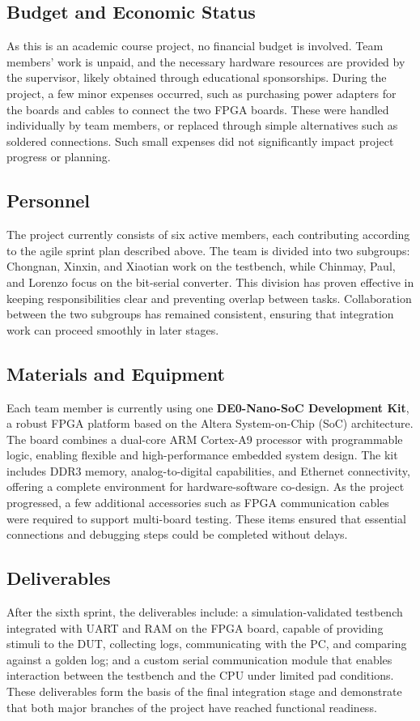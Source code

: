 \documentclass[10pt]{article}
\begin{document}
\subsection{Budget and Economic Status}
As this is an academic course project, no financial budget is involved. Team members’ work is unpaid, and the necessary hardware resources are provided by the supervisor, likely obtained through educational sponsorships.
During the project, a few minor expenses occurred, such as purchasing power adapters for the boards and cables to connect the two FPGA boards. These were handled individually by team members, or replaced through simple alternatives such as soldered connections. Such small expenses did not significantly impact project progress or planning.

\subsection{Personnel}
The project currently consists of six active members, each contributing according to the agile sprint plan described above.
The team is divided into two subgroups: Chongnan, Xinxin, and Xiaotian work on the testbench, while Chinmay, Paul, and Lorenzo focus on the bit-serial converter.
This division has proven effective in keeping responsibilities clear and preventing overlap between tasks. Collaboration between the two subgroups has remained consistent, ensuring that integration work can proceed smoothly in later stages.

\subsection{Materials and Equipment}
Each team member is currently using one \textbf{DE0-Nano-SoC Development Kit}, a robust FPGA platform based on the Altera System-on-Chip (SoC) architecture. The board combines a dual-core ARM Cortex-A9 processor with programmable logic, enabling flexible and high-performance embedded system design. The kit includes DDR3 memory, analog-to-digital capabilities, and Ethernet connectivity, offering a complete environment for hardware-software co-design.
As the project progressed, a few additional accessories such as FPGA communication cables were required to support multi-board testing. These items ensured that essential connections and debugging steps could be completed without delays.

\subsection{Deliverables}
After the sixth sprint, the deliverables include: a simulation-validated testbench integrated with UART and RAM on the FPGA board, capable of providing stimuli to the DUT, collecting logs, communicating with the PC, and comparing against a golden log; and a custom serial communication module that enables interaction between the testbench and the CPU under limited pad conditions. These deliverables form the basis of the final integration stage and demonstrate that both major branches of the project have reached functional readiness.
\end{document}
